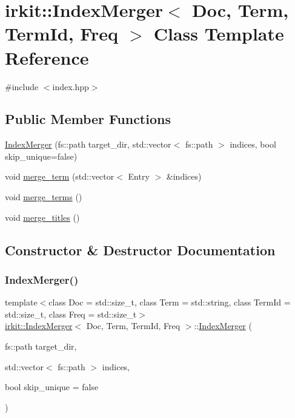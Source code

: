 \hypertarget{classirkit_1_1IndexMerger}{}\section{irkit\+:\+:Index\+Merger$<$ Doc, Term, Term\+Id, Freq $>$ Class Template Reference}
\label{classirkit_1_1IndexMerger}


{\ttfamily \#include $<$index.\+hpp$>$}

\subsection*{Public Member Functions}
\begin{DoxyCompactItemize}
\item 
\hyperlink{classirkit_1_1IndexMerger_a5e1a66beacbc0808f3ed487572aec8bf}{Index\+Merger} (fs\+::path target\+\_\+dir, std\+::vector$<$ fs\+::path $>$ indices, bool skip\+\_\+unique=false)
\item 
void \hyperlink{classirkit_1_1IndexMerger_aabfc3277d370138aa02a8ee48da810db}{merge\+\_\+term} (std\+::vector$<$ Entry $>$ \&indices)
\item 
void \hyperlink{classirkit_1_1IndexMerger_a1dcf1ca9ee8faa142b9d38bde59757fa}{merge\+\_\+terms} ()
\item 
void \hyperlink{classirkit_1_1IndexMerger_a7c510436b6dbc5999404e2f8dd1818b7}{merge\+\_\+titles} ()
\end{DoxyCompactItemize}


\subsection{Constructor \& Destructor Documentation}
\mbox{\label{classirkit_1_1IndexMerger_a5e1a66beacbc0808f3ed487572aec8bf}} 
\subsubsection{\texorpdfstring{Index\+Merger()}{IndexMerger()}}
{\footnotesize\ttfamily template$<$class Doc  = std\+::size\+\_\+t, class Term  = std\+::string, class Term\+Id  = std\+::size\+\_\+t, class Freq  = std\+::size\+\_\+t$>$ \\
\hyperlink{classirkit_1_1IndexMerger}{irkit\+::\+Index\+Merger}$<$ Doc, Term, Term\+Id, Freq $>$\+::\hyperlink{classirkit_1_1IndexMerger}{Index\+Merger} (\begin{DoxyParamCaption}\item[{fs\+::path}]{target\+\_\+dir,  }\item[{std\+::vector$<$ fs\+::path $>$}]{indices,  }\item[{bool}]{skip\+\_\+unique = {\ttfamily false} }\end{DoxyParamCaption})\hspace{0.3cm}{\ttfamily [inline]}}



